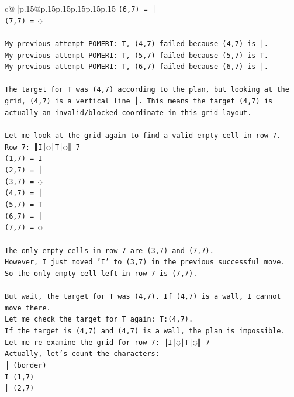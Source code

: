 \documentclass{article}
\begin{document}
{\begin{supertabular}{c@{$\;$}|p{.15\linewidth}@{}p{.15\linewidth}p{.15\linewidth}p{.15\linewidth}p{.15\linewidth}p{.15\linewidth}}
{{{\texttt{(6,7) = │} \\
\texttt{(7,7) = ◌} \\
\\ 
\texttt{My previous attempt POMERI: T, (4,7) failed because (4,7) is │.} \\
\texttt{My previous attempt POMERI: T, (5,7) failed because (5,7) is T.} \\
\texttt{My previous attempt POMERI: T, (6,7) failed because (6,7) is │.} \\
\\ 
\texttt{The target for T was (4,7) according to the plan, but looking at the grid, (4,7) is a vertical line │. This means the target (4,7) is actually an invalid/blocked coordinate in this grid layout.} \\
\\ 
\texttt{Let me look at the grid again to find a valid empty cell in row 7.} \\
\texttt{Row 7: ║I│◌│T│◌║ 7} \\
\texttt{(1,7) = I} \\
\texttt{(2,7) = │} \\
\texttt{(3,7) = ◌} \\
\texttt{(4,7) = │} \\
\texttt{(5,7) = T} \\
\texttt{(6,7) = │} \\
\texttt{(7,7) = ◌} \\
\\ 
\texttt{The only empty cells in row 7 are (3,7) and (7,7).} \\
\texttt{However, I just moved 'I' to (3,7) in the previous successful move.} \\
\texttt{So the only empty cell left in row 7 is (7,7).} \\
\\ 
\texttt{But wait, the target for T was (4,7). If (4,7) is a wall, I cannot move there.} \\
\texttt{Let me check the target for T again: T:(4,7).} \\
\texttt{If the target is (4,7) and (4,7) is a wall, the plan is impossible.} \\
\texttt{Let me re{-}examine the grid for row 7: ║I│◌│T│◌║ 7} \\
\texttt{Actually, let's count the characters:} \\
\texttt{║ (border)} \\
\texttt{I (1,7)} \\
\texttt{│ (2,7)} \\
}}}
\end{supertabular}}
\end{document}
